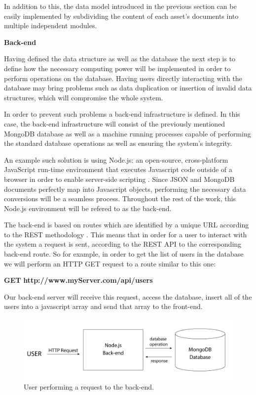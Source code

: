 In addition to this, the data model introduced in the previous section can be easily implemented by subdividing the content of each asset's documents into multiple independent modules.

\vspace{4mm}
\textbf{Back-end}
\vspace{2mm}

Having defined the data structure as well as the database the next step is to define how the necessary computing power will be implemented in order to perform operations on the database. Having users directly interacting with the database may bring problems such as data duplication or insertion of invalid data structures, which will compromise the whole system.

In order to prevent such problems a back-end infrastructure is defined. In this case, the back-end infrastructure will consist of the previously mentioned MongoDB database as well as a machine running processes capable of performing the standard database operations as well as ensuring the system's integrity.

An example such solution is using Node.js: an open-source, cross-platform JavaScript run-time environment that executes Javascript code outside of a browser in order to enable server-side scripting \cite{Corporation2019Node.jsGuide}. Since JSON and MongoDB documents perfectly map into Javascript objects, performing the necessary data conversions will be a seamless process. Throughout the rest of the work, this Node.js environment will be refered to as the back-end.

The back-end is based on routes which are identified by a unique URL according to the REST methodology \cite{GregorioIntroREST}. This means that in order for a user to interact with the system a request is sent, according to the REST API to the corresponding back-end route. So for example, in order to get the list of users in the database we will perform an HTTP GET request to a route similar to this one:

\textbf{GET}
\textbf{http://www.myServer.com/api/users}

Our back-end server will receive this request, access the database, insert all of the users into a javascript array and send that array to the front-end.

\begin{figure}[h!]
    \centering
    \includegraphics[scale=0.23]{images/Backend/backendRequest.jpg}
    \caption[Back-end request]{User performing a request to the back-end.}
    \label{backendRequest}
\end{figure}

